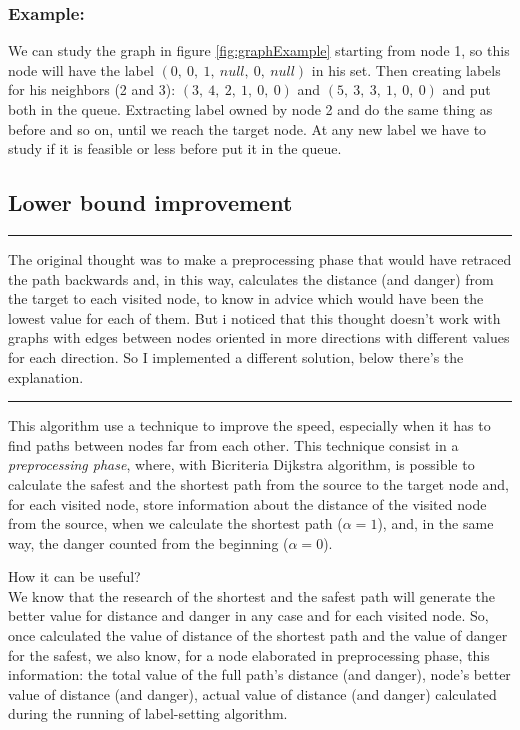 \documentclass[a4paper,11pt]{report}
\begin{document}
\subsubsection*{Example:}
We can study the graph in figure \ref{fig:graphExample} starting from node 1, so this node will have the label $(0,\ 0,\ 1,\ null,\ 0,\ null)$ in his set. Then creating labels for his neighbors (2 and 3): $(3,\ 4,\ 2,\ 1,\ 0,\ 0)$ and $(5,\ 3,\ 3,\ 1,\ 0,\ 0)$ and put both in the queue. Extracting label owned by node 2 and do the same thing as before and so on, until we reach the target node. At any new label we have to study if it is feasible or less before put it in the queue.

\subsection{Lower bound improvement}
\begin{center}
	\noindent\rule{8cm}{0.1em}
\end{center}
{\small The original thought was to make a preprocessing phase that would have retraced the path backwards and, in this way, calculates the distance (and danger) from the target to each visited node, to know in advice which would have been the lowest value for each of them. But i noticed that this thought doesn't work with graphs with edges between nodes oriented in more directions with different values for each direction. So I implemented a different solution, below there's the explanation.}
\begin{center}
	\noindent\rule{8cm}{0.1pt}
\end{center}
This algorithm use a technique to improve the speed, especially when it has to find paths between nodes far from each other. This technique consist in a \textit{preprocessing phase}, where, with Bicriteria Dijkstra algorithm, is possible to calculate the safest and the shortest path from the source to the target node and, for each visited node, store information about the distance of the visited node from the source, when we calculate the shortest path ($\alpha = 1$), and, in the same way, the danger counted from the beginning ($\alpha = 0$).

How it can be useful?
\\
We know that the research of the shortest and the safest path will generate the better value for distance and danger in any case and for each visited node. So, once calculated the value of distance of the shortest path and the value of danger for the safest, we also know, for a node elaborated in preprocessing phase, this information: the total value of the full path's distance (and danger), node's better value of distance (and danger), actual value of distance (and danger) calculated during the running of label-setting algorithm. 
\end{document}
